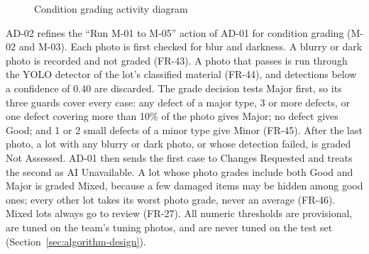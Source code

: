 \begin{figure}[H]
\caption{Condition grading activity diagram}
\label{fig:ad-02}
\end{figure}

AD-02 refines the ``Run M-01 to M-05'' action of AD-01 for condition grading (M-02
and M-03). Each photo is first checked for blur and darkness. A blurry or dark photo
is recorded and not graded (FR-43). A photo that passes is run through the YOLO
detector of the lot's classified material (FR-44), and detections below a confidence
of 0.40 are discarded. The grade decision tests Major first, so its three guards
cover every case: any defect of a major type, 3 or more defects, or one defect
covering more than 10\% of the photo gives Major; no defect gives Good; and 1 or 2
small defects of a minor type give Minor (FR-45). After the last photo, a lot with
any blurry or dark photo, or whose detection failed, is graded Not Assessed. AD-01 then
sends the first case to Changes Requested and treats the second as AI Unavailable. A
lot whose photo grades include both Good and Major is graded Mixed, because a few
damaged items may be hidden among good ones; every other lot takes its worst photo
grade, never an average (FR-46). Mixed lots always go to review (FR-27). All numeric
thresholds are provisional, are tuned on the team's tuning photos, and are never
tuned on the test set (Section~\ref{sec:algorithm-design}).

